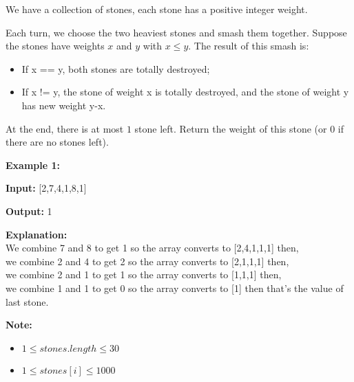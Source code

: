 \documentclass[a4paper]{article}
\begin{document}
We have a collection of stones, each stone has a positive integer weight.

Each turn, we choose the two heaviest stones and smash them together.  Suppose the stones have weights $x$ and $y$ with $x \le y$.  The result of this smash is:
\begin{itemize}
\item If x == y, both stones are totally destroyed;
\item If x != y, the stone of weight x is totally destroyed, and the stone of weight y has new weight y-x.
\end{itemize}
At the end, there is at most $1$ stone left. Return the weight of this stone (or $0$ if there are no stones left).

\SPACE

\textbf{Example 1:}

\textbf{Input:} [2,7,4,1,8,1]

\textbf{Output:} 1

\textbf{Explanation:}\\
We combine 7 and 8 to get 1 so the array converts to [2,4,1,1,1] then,\\
we combine 2 and 4 to get 2 so the array converts to [2,1,1,1] then,\\
we combine 2 and 1 to get 1 so the array converts to [1,1,1] then,\\
we combine 1 and 1 to get 0 so the array converts to [1] then that's the value of last stone.


\textbf{Note:}

\begin{itemize}
\item $1 \le stones.length \le 30$
\item $1 \le stones[i] \le 1000$
\end{itemize}
\end{document}
